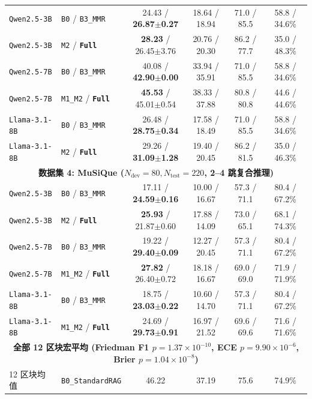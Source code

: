 \documentclass[11pt]{article}
\begin{document}
\begin{table}[t]
{{\begin{tabular}{llcccc}
\midrule
\texttt{Qwen2.5-3B} & \texttt{B0} / \texttt{B3\_MMR} & 24.43 / \textbf{26.87$\pm$0.27} & 18.64 / 18.94 & 71.0 / 85.5 & 58.8 / 34.6\% \\
\texttt{Qwen2.5-3B} & \texttt{M2} / \textbf{\texttt{Full}} & \textbf{28.23} / 26.45$\pm$3.76 & 20.76 / 20.30 & 86.2 / 77.7 & 35.0 / 48.3\% \\
\texttt{Qwen2.5-7B} & \texttt{B0} / \texttt{B3\_MMR} & 40.08 / \textbf{42.90$\pm$0.00} & 33.94 / 35.91 & 71.0 / 85.5 & 58.8 / 34.6\% \\
\texttt{Qwen2.5-7B} & \texttt{M1\_M2} / \textbf{\texttt{Full}} & \textbf{45.53} / 45.01$\pm$0.54 & 38.33 / 37.88 & 80.8 / 80.8 & 44.6 / 44.6\% \\
\texttt{Llama-3.1-8B} & \texttt{B0} / \texttt{B3\_MMR} & 26.48 / \textbf{28.75$\pm$0.34} & 17.58 / 18.49 & 71.0 / 85.5 & 58.8 / 34.6\% \\
\texttt{Llama-3.1-8B} & \texttt{M2} / \textbf{\texttt{Full}} & 29.26 / \textbf{31.09$\pm$1.28} & 19.40 / 20.45 & 86.2 / 81.5 & 35.0 / 46.3\% \\
\midrule
\multicolumn{6}{c}{\textbf{数据集 4: MuSiQue ($N_{\text{dev}}=80, N_{\text{test}}=220$, 2--4 跳复合推理)}} \\
\midrule
\texttt{Qwen2.5-3B} & \texttt{B0} / \texttt{B3\_MMR} & 17.11 / \textbf{24.59$\pm$0.16} & 10.00 / 16.67 & 57.3 / 71.1 & 80.4 / 67.2\% \\
\texttt{Qwen2.5-3B} & \texttt{M2} / \textbf{\texttt{Full}} & \textbf{25.93} / 21.87$\pm$0.60 & 17.88 / 14.09 & 73.0 / 65.1 & 68.1 / 74.3\% \\
\texttt{Qwen2.5-7B} & \texttt{B0} / \texttt{B3\_MMR} & 19.22 / \textbf{29.40$\pm$0.09} & 12.27 / 20.45 & 57.3 / 71.1 & 80.4 / 67.2\% \\
\texttt{Qwen2.5-7B} & \texttt{M1\_M2} / \textbf{\texttt{Full}} & \textbf{27.82} / 26.40$\pm$0.72 & 18.18 / 16.67 & 69.0 / 69.0 & 71.9 / 71.9\% \\
\texttt{Llama-3.1-8B} & \texttt{B0} / \texttt{B3\_MMR} & 18.75 / \textbf{23.03$\pm$0.22} & 10.60 / 14.70 & 57.3 / 71.1 & 80.4 / 67.2\% \\
\texttt{Llama-3.1-8B} & \texttt{M1\_M2} / \textbf{\texttt{Full}} & 24.69 / \textbf{29.73$\pm$0.91} & 16.97 / 21.52 & 69.6 / 69.6 & 71.6 / 71.6\% \\
\midrule
\multicolumn{6}{c}{\textbf{全部 12 区块宏平均 (Friedman F1 $p=1.37\times 10^{-10}$, ECE $p=9.90\times 10^{-6}$, Brier $p=1.04\times 10^{-8}$)}} \\
\midrule
\multirow{7}{*}{12 区块均值} & \texttt{B0\_StandardRAG} & 46.22 & 37.19 & 75.6 & 74.9\% \\

\end{tabular}}}
\end{table}
\end{document}
